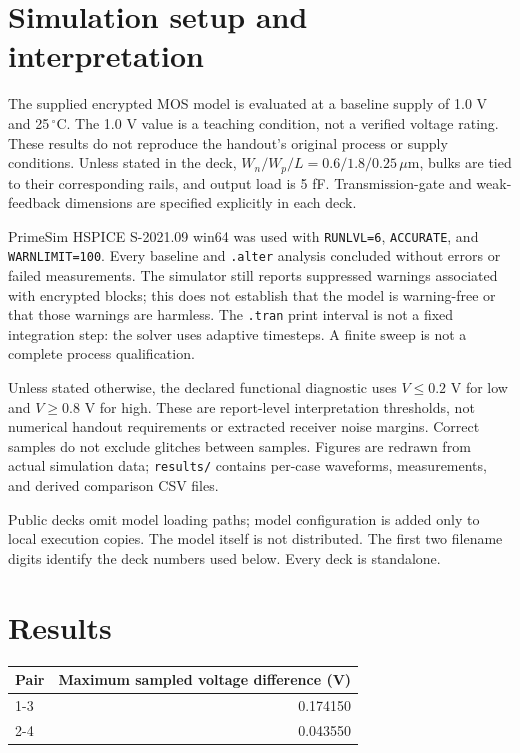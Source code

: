 \section{Simulation setup and interpretation}

The supplied encrypted MOS model is evaluated at a baseline supply of 1.0 V and 25\,$^\circ$C. The 1.0 V value is a teaching condition, not a verified voltage rating. These results do not reproduce the handout's original process or supply conditions. Unless stated in the deck, $W_n/W_p/L=0.6/1.8/0.25\,\mu\mathrm m$, bulks are tied to their corresponding rails, and output load is 5 fF. Transmission-gate and weak-feedback dimensions are specified explicitly in each deck.

PrimeSim HSPICE S-2021.09 win64 was used with \texttt{RUNLVL=6}, \texttt{ACCURATE}, and \texttt{WARNLIMIT=100}. Every baseline and \texttt{.alter} analysis concluded without errors or failed measurements. The simulator still reports suppressed warnings associated with encrypted blocks; this does not establish that the model is warning-free or that those warnings are harmless. The \texttt{.tran} print interval is not a fixed integration step: the solver uses adaptive timesteps. A finite sweep is not a complete process qualification.

Unless stated otherwise, the declared functional diagnostic uses $V\leq0.2$ V for low and $V\geq0.8$ V for high. These are report-level interpretation thresholds, not numerical handout requirements or extracted receiver noise margins. Correct samples do not exclude glitches between samples. Figures are redrawn from actual simulation data; \texttt{results/} contains per-case waveforms, measurements, and derived comparison CSV files.

Public decks omit model loading paths; model configuration is added only to local execution copies. The model itself is not distributed. The first two filename digits identify the deck numbers used below. Every deck is standalone.

\section{Results}

\begin{center}
\small
\setlength{\tabcolsep}{4pt}
\begin{tabular}{lr}
\toprule
Pair & Maximum sampled voltage difference (V) \\
\midrule
1-3 & 0.174150 \\
2-4 & 0.043550 \\
\bottomrule
\end{tabular}
\end{center}

